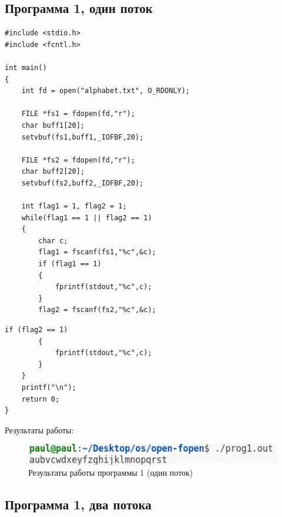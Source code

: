 \subsection*{Программа 1, один поток}

\begin{center}
	\captionsetup{justification=raggedright,singlelinecheck=off}

	\begin{lstlisting}[label=lst:prog1-1,caption=Программа 1 --- один поток--- часть 1]
#include <stdio.h>
#include <fcntl.h>

int main()
{
    int fd = open("alphabet.txt", O_RDONLY);

    FILE *fs1 = fdopen(fd,"r");
    char buff1[20];
    setvbuf(fs1,buff1,_IOFBF,20);

    FILE *fs2 = fdopen(fd,"r");
    char buff2[20];
    setvbuf(fs2,buff2,_IOFBF,20);
    
    int flag1 = 1, flag2 = 1;
    while(flag1 == 1 || flag2 == 1)
    {
        char c;
        flag1 = fscanf(fs1,"%c",&c);
        if (flag1 == 1) 
        {
            fprintf(stdout,"%c",c);
        }
        flag2 = fscanf(fs2,"%c",&c);
	\end{lstlisting}
\end{center}

\clearpage

\begin{center}
	\captionsetup{justification=raggedright,singlelinecheck=off}

	\begin{lstlisting}[label=lst:prog1-2,caption=Программа 1 --- один поток --- часть 2]
        if (flag2 == 1) 
        { 
            fprintf(stdout,"%c",c); 
        }
    }
    printf("\n");
    return 0;
}
	\end{lstlisting}
\end{center}

Результаты работы:

\begin{figure}[h]
	\centering
	\captionsetup{justification=centering}
	\includegraphics[width=150mm]{img/prog1.png}
	\caption{Результаты работы программы 1 (один поток)}
	\label{fig:prog-1-result}
\end{figure}

\subsection*{Программа 1, два потока}


